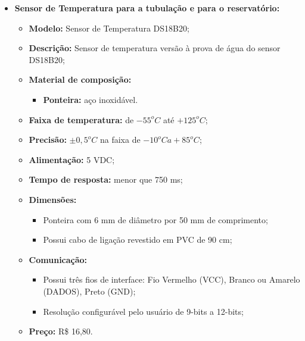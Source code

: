 \begin{itemize}
	\item \textbf{ Sensor de Temperatura para a tubulação e para o reservatório:}
	\begin{itemize}
		\item \textbf{ Modelo:} Sensor de Temperatura DS18B20;
		\item \textbf{ Descrição:} Sensor de temperatura versão à prova de água do sensor DS18B20; 
		\item \textbf{ Material de composição:}
		\begin{itemize}
			\item \textbf{ Ponteira:} aço inoxidável.
		\end{itemize}
		\item \textbf{ Faixa de temperatura:} de $ -55^oC$ até $+125^oC$;
		\item \textbf{ Precisão:} $\pm0,5^oC$ na faixa de $-10^oC a +85^oC$; 
		\item \textbf{ Alimentação:} 5 VDC;
		\item \textbf{ Tempo de resposta:} menor que 750 ms;
		\item \textbf{ Dimensões:}
		\begin{itemize}
			\item Ponteira com 6 mm de diâmetro por 50 mm de comprimento;
			\item Possui cabo de ligação revestido em PVC de 90 cm;
		\end{itemize}
		\item \textbf{ Comunicação:}
		\begin{itemize}
			\item Possui três fios de interface: Fio Vermelho (VCC), Branco ou Amarelo (DADOS), Preto (GND);
			\item Resolução configurável pelo usuário de 9-bits a 12-bits;
		\end{itemize}
		
		\item \textbf{ Preço:} R\$ 16,80.
\end{itemize}
\end{itemize}
